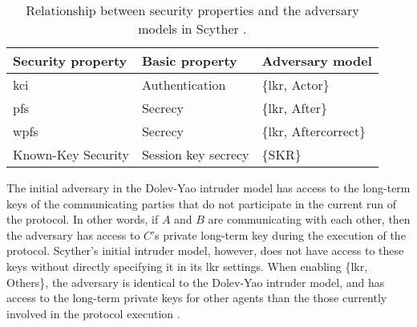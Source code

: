\begin{table}[h]
\centering
\begin{tabular}{|l|l|l|}
\hline
Security property                   & Basic property           & Adversary model    			\\ \hline
\gls{kci} 							 & Authentication           & \{\gls{lkr}, Actor\}        	\\ \hline
\gls{pfs}      						 & Secrecy                  & \{\gls{lkr}, After\}        \\ \hline
\gls{wpfs} 						     & Secrecy                  & \{\gls{lkr}, Aftercorrect\} \\ \hline
Known-Key Security                  & Session key secrecy 		 & \{SKR\}                		\\ \hline
\end{tabular}
\caption{Relationship between security properties and the adversary models in Scyther \cite{basin2010modeling}.}
\label{tab:sec-prop-adv-mod}
\end{table}

\newpage

The initial adversary in the Dolev-Yao intruder model has access to the long-term keys of the communicating parties that do not participate in the current run of the protocol. In other words, if $A$ and $B$ are communicating with each other, then the adversary has access to $C$'s private long-term key during the execution of the protocol. Scyther's initial intruder model, however, does not have access to these keys without directly specifying it in its \gls{lkr} settings. When enabling \{\gls{lkr}, Others\}, the adversary is identical to the Dolev-Yao intruder model, and has access to the long-term private keys for other agents than the those currently involved in the protocol execution \cite{basin2010modeling}.

